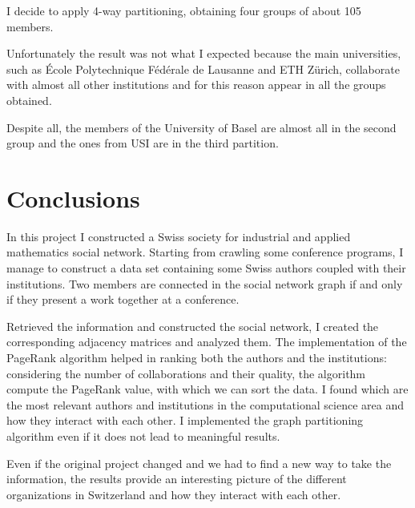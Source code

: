 \documentclass[]{usiinfbachelorproject}
\begin{document}
I decide to apply 4-way partitioning, obtaining four groups of about 105 members.

Unfortunately the result was not what I expected because the main universities, such as \'{E}cole Polytechnique F\'{e}d\'{e}rale de Lausanne and ETH Z\"{u}rich, collaborate with almost all other institutions and for this reason appear in all the groups obtained.  

Despite all, the members of the University of Basel are almost all in the second group and the ones from USI are in the third partition.







\section{Conclusions} \label{sec:conclusions}
In this project I constructed a Swiss society for industrial and applied mathematics social network. 
Starting from crawling some conference programs, I manage to construct a data set containing some Swiss authors coupled with their institutions. Two members are connected in the social network graph if and only if they present a work together at a conference. 

Retrieved the information and constructed the social network, I created the corresponding adjacency matrices and analyzed them. The implementation of the PageRank algorithm helped in ranking both the authors and the institutions: considering the number of collaborations and their quality, the algorithm compute the PageRank value, with which we can sort the data. 
I found which are the most relevant authors and institutions in the computational science area and how they interact with each other.
I implemented the graph partitioning algorithm even if it does not lead to meaningful results.

Even if the original project changed and we had to find a new way to take the information, the results provide an interesting picture of the different organizations in Switzerland and how they interact with each other.





\end{document}

